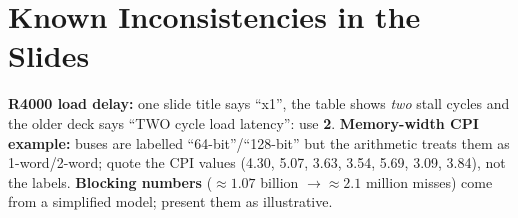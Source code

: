 \section{Known Inconsistencies in the Slides}\label{app:src}
\textbf{R4000 load delay:} one slide title says ``x1'', the table shows \emph{two} stall cycles and the older deck says ``TWO cycle load latency'': use \textbf{2}.
\textbf{Memory-width CPI example:} buses are labelled ``64-bit''/``128-bit'' but the arithmetic treats them as 1-word/2-word; quote the CPI values (4.30, 5.07, 3.63, 3.54, 5.69, 3.09, 3.84), not the labels.
\textbf{Blocking numbers} ($\approx1.07$ billion $\to\approx2.1$ million misses) come from a simplified model; present them as illustrative.
